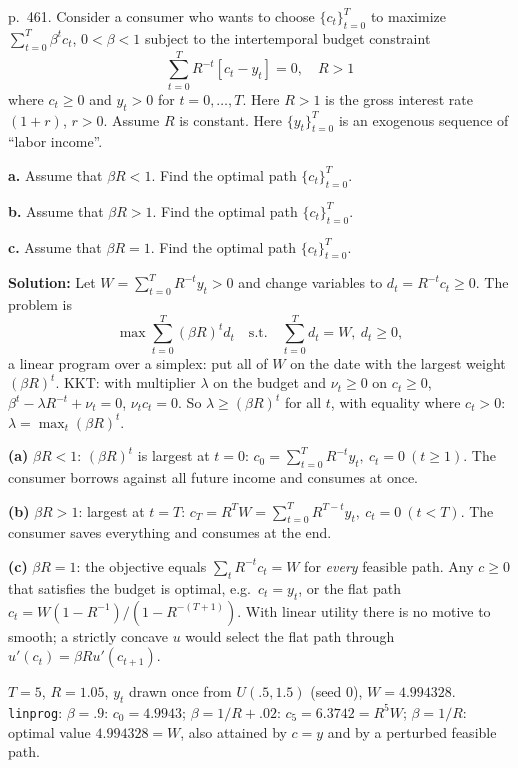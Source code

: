 \documentclass[12pt, letterpaper]{article}
\begin{document}
\begin{tcolorbox}[oddbox,title={Exercise 11.9 \quad Linear utility, finite horizon}]
\begin{tcolorbox}[questionbox]
p.~461. Consider a consumer who wants to choose $\{c_t\}_{t=0}^T$ to maximize $\sum_{t=0}^T\beta^tc_t$, $0<\beta<1$ subject
to the intertemporal budget constraint
\[
\sum_{t=0}^TR^{-t}[c_t-y_t]=0,\quad R>1
\]
where $c_t\ge0$ and $y_t>0$ for $t=0,\dots,T$. Here $R>1$ is the gross interest rate $(1+r)$, $r>0$. Assume $R$ is
constant. Here $\{y_t\}_{t=0}^T$ is an exogenous sequence of ``labor income''.

\textbf{a.} Assume that $\beta R<1$. Find the optimal path $\{c_t\}_{t=0}^T$.

\textbf{b.} Assume that $\beta R>1$. Find the optimal path $\{c_t\}_{t=0}^T$.

\textbf{c.} Assume that $\beta R=1$. Find the optimal path $\{c_t\}_{t=0}^T$.
\end{tcolorbox}

\textbf{Solution:} Let $W=\sum_{t=0}^TR^{-t}y_t>0$ and change variables to $d_t=R^{-t}c_t\ge0$. The problem is
\[
\max\sum_{t=0}^T(\beta R)^td_t\quad\text{s.t.}\quad\sum_{t=0}^Td_t=W,\ d_t\ge0,
\]
a linear program over a simplex: put all of $W$ on the date with the largest weight $(\beta R)^t$. KKT: with multiplier
$\lambda$ on the budget and $\nu_t\ge0$ on $c_t\ge0$, $\beta^t-\lambda R^{-t}+\nu_t=0$, $\nu_tc_t=0$. So
$\lambda\ge(\beta R)^t$ for all $t$, with equality where $c_t>0$: $\lambda=\max_t(\beta R)^t$.

\textbf{(a)} $\beta R<1$: $(\beta R)^t$ is largest at $t=0$:
$\boxed{c_0=\sum_{t=0}^TR^{-t}y_t,\ c_t=0\ (t\ge1)}$. The consumer borrows against all future income and consumes at once.

\textbf{(b)} $\beta R>1$: largest at $t=T$: $\boxed{c_T=R^TW=\sum_{t=0}^TR^{T-t}y_t,\ c_t=0\ (t<T)}$. The consumer saves
everything and consumes at the end.

\textbf{(c)} $\beta R=1$: the objective equals $\sum_tR^{-t}c_t=W$ for \emph{every} feasible path. Any $c\ge0$ that
satisfies the budget is optimal, e.g.\ $c_t=y_t$, or the flat path $c_t=W(1-R^{-1})/(1-R^{-(T+1)})$. With linear utility
there is no motive to smooth; a strictly concave $u$ would select the flat path through $u'(c_t)=\beta Ru'(c_{t+1})$.

\begin{tcolorbox}[databox]
$T=5$, $R=1.05$, $y_t$ drawn once from $U(.5,1.5)$ (seed 0), $W=4.994328$. \texttt{linprog}: $\beta=.9$: $c_0=4.9943$;
$\beta=1/R+.02$: $c_5=6.3742=R^5W$; $\beta=1/R$: optimal value $4.994328=W$, also attained by $c=y$ and by a perturbed
feasible path.
\end{tcolorbox}
\end{tcolorbox}
\end{document}
